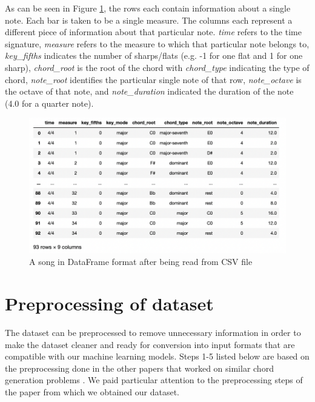 As can be seen in Figure \ref{fig:CSV_DF}, the rows each contain information about a single note. Each bar is taken to be a single measure. The columns each represent a different piece of information about that particular note. \emph{time} refers to the time signature, \emph{measure} refers to the measure to which that particular note belongs to, \emph{key\_fifths} indicates the number of sharps/flats (e.g. -1 for one flat and 1 for one sharp), \emph{chord\_root} is the root of the chord with \emph{chord\_type} indicating the type of chord, \emph{note\_root} identifies the particular single note of that row, \emph{note\_octave} is the octave of that note, and \emph{note\_duration} indicated the duration of the note (4.0 for a quarter note).

\begin{figure}
\centering
\includegraphics{Figures/CSV dataframe}
\decoRule
\caption{A song in DataFrame format after being read from CSV file}
\label{fig:CSV_DF}
\end{figure}

\section{Preprocessing of dataset}
\label{preprocessing}

The dataset can be preprocessed to remove unnecessary information in order to make the dataset cleaner and ready for conversion into input formats that are compatible with our machine learning models. Steps 1-5 listed below are based on the preprocessing done in the other papers that worked on similar chord generation problems \cite{MySong} \cite{BLSTM} \cite{MLForChords}. We paid particular attention to the preprocessing steps of the paper \cite{BLSTM} from which we obtained our dataset.

